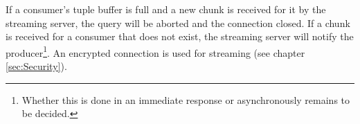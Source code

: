 If a consumer's tuple buffer is full and a new chunk is received for it by
the streaming server, the query will be aborted and the connection closed.
If a chunk is received for a consumer that
does not exist, the streaming server will notify the producer\footnote{Whether
this is done in an immediate response or asynchronously remains to be decided.}.
An encrypted connection is used for streaming (see
chapter \ref{sec:Security}).
